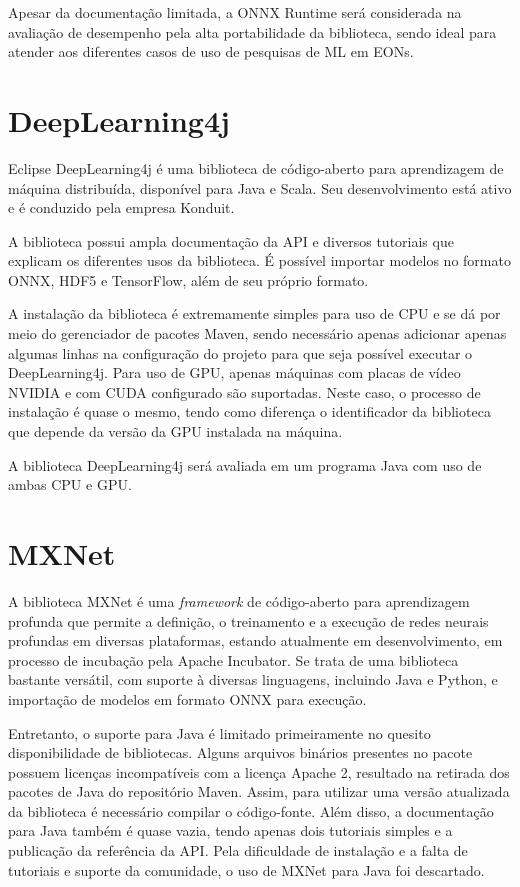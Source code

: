 Apesar da documentação limitada, a ONNX Runtime será considerada na avaliação de desempenho pela alta portabilidade da biblioteca, sendo ideal para atender aos diferentes casos de uso de pesquisas de ML em EONs.

\section{DeepLearning4j}

Eclipse DeepLearning4j \cite{ml_site_deeplearning4j} é uma biblioteca de código-aberto para aprendizagem de máquina distribuída, disponível para Java e Scala. Seu desenvolvimento está ativo e é conduzido pela empresa Konduit.

A biblioteca possui ampla documentação da API e diversos tutoriais que explicam os diferentes usos da biblioteca. É possível importar modelos no formato ONNX, HDF5 e TensorFlow, além de seu próprio formato.

A instalação da biblioteca é extremamente simples para uso de CPU e se dá por meio do gerenciador de pacotes Maven, sendo necessário apenas adicionar apenas algumas linhas na configuração do projeto para que seja possível executar o DeepLearning4j. Para uso de GPU, apenas máquinas com placas de vídeo NVIDIA e com CUDA configurado são suportadas. Neste caso, o processo de instalação é quase o mesmo, tendo como diferença o identificador da biblioteca que depende da versão da GPU instalada na máquina.

A biblioteca DeepLearning4j será avaliada em um programa Java com uso de ambas CPU e GPU.

\section{MXNet}

A biblioteca MXNet \cite{ml_site_mxnet} é uma \textit{framework} de código-aberto para aprendizagem profunda que permite a definição, o treinamento e a execução de redes neurais profundas em diversas plataformas, estando atualmente em desenvolvimento, em processo de incubação pela Apache Incubator. Se trata de uma biblioteca bastante versátil, com suporte à diversas linguagens, incluindo Java e Python, e importação de modelos em formato ONNX para execução.

Entretanto, o suporte para Java é limitado primeiramente no quesito disponibilidade de bibliotecas. Alguns arquivos binários presentes no pacote possuem licenças incompatíveis com a licença Apache 2, resultado na retirada dos pacotes de Java do repositório Maven. Assim, para utilizar uma versão atualizada da biblioteca é necessário compilar o código-fonte. Além disso, a documentação para Java também é quase vazia, tendo apenas dois tutoriais simples e a publicação da referência da API. Pela dificuldade de instalação e a falta de tutoriais e suporte da comunidade, o uso de MXNet para Java foi descartado.

